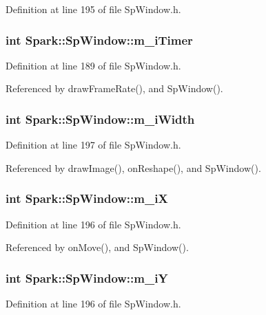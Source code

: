 Definition at line 195 of file Sp\-Window.h.
\subsubsection{\setlength{\rightskip}{0pt plus 5cm}int {\bf Spark::Sp\-Window::m\_\-i\-Timer}\hspace{0.3cm}{\tt  [protected]}}\label{classSpark_1_1SpWindow_p8}


Definition at line 189 of file Sp\-Window.h.

Referenced by draw\-Frame\-Rate(), and Sp\-Window().
\subsubsection{\setlength{\rightskip}{0pt plus 5cm}int {\bf Spark::Sp\-Window::m\_\-i\-Width}\hspace{0.3cm}{\tt  [protected]}}\label{classSpark_1_1SpWindow_p14}


Definition at line 197 of file Sp\-Window.h.

Referenced by draw\-Image(), on\-Reshape(), and Sp\-Window().
\subsubsection{\setlength{\rightskip}{0pt plus 5cm}int {\bf Spark::Sp\-Window::m\_\-i\-X}\hspace{0.3cm}{\tt  [protected]}}\label{classSpark_1_1SpWindow_p12}


Definition at line 196 of file Sp\-Window.h.

Referenced by on\-Move(), and Sp\-Window().
\subsubsection{\setlength{\rightskip}{0pt plus 5cm}int {\bf Spark::Sp\-Window::m\_\-i\-Y}\hspace{0.3cm}{\tt  [protected]}}\label{classSpark_1_1SpWindow_p13}


Definition at line 196 of file Sp\-Window.h.

